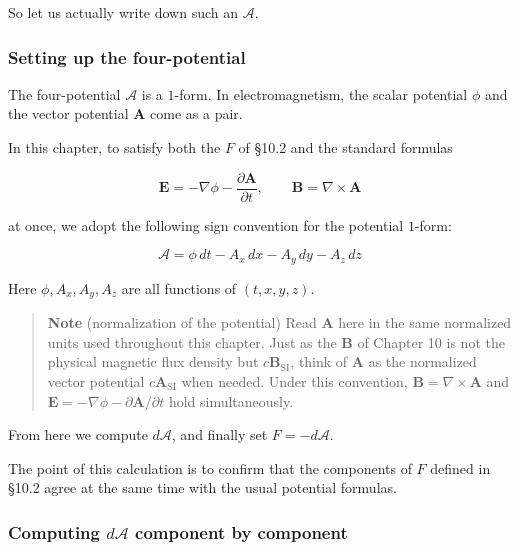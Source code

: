 \documentclass[a4paper,12pt,openany]{book}
\begin{document}
So let us actually write down such an \(\mathcal{A}\).

\hypertarget{setting-up-the-four-potential}{%
\subsubsection{Setting up the
four-potential}\label{setting-up-the-four-potential}}

The four-potential \(\mathcal{A}\) is a \(1\)-form. In electromagnetism,
the scalar potential \(\phi\) and the vector potential \(\mathbf{A}\)
come as a pair.

In this chapter, to satisfy both the \(F\) of §10.2 and the standard
formulas

\[
\mathbf{E}
=
-\nabla\phi
-
\frac{\partial\mathbf{A}}{\partial t},
\qquad
\mathbf{B}
=
\nabla\times\mathbf{A}
\]

at once, we adopt the following sign convention for the potential
\(1\)-form:

\[
\mathcal{A}
=
\phi\,dt
-
A_x\,dx
-
A_y\,dy
-
A_z\,dz
\]

Here \(\phi,A_x,A_y,A_z\) are all functions of \((t,x,y,z)\).

\begin{quote}
\textbf{Note} (normalization of the potential) Read \(\mathbf{A}\) here
in the same normalized units used throughout this chapter. Just as the
\(\mathbf{B}\) of Chapter 10 is not the physical magnetic flux density
but \(c\mathbf{B}_{\mathrm{SI}}\), think of \(\mathbf{A}\) as the
normalized vector potential \(c\mathbf{A}_{\mathrm{SI}}\) when needed.
Under this convention, \(\mathbf{B}=\nabla\times\mathbf{A}\) and
\(\mathbf{E}=-\nabla\phi-\partial\mathbf{A}/\partial t\) hold
simultaneously.
\end{quote}

From here we compute \(d\mathcal{A}\), and finally set
\(F=-d\mathcal{A}\).

The point of this calculation is to confirm that the components of \(F\)
defined in §10.2 agree at the same time with the usual potential
formulas.

\hypertarget{computing-dmathcala-component-by-component}{%
\subsubsection{\texorpdfstring{Computing \(d\mathcal{A}\) component by
component}{Computing d\textbackslash mathcal\{A\} component by component}}\label{computing-dmathcala-component-by-component}}
\end{document}
